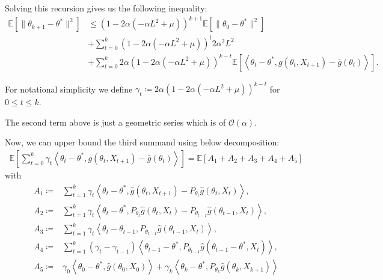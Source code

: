 \documentclass[a4paper]{article}
\newcommand{\norm}[1]{\|#1 \|}
\newcommand{\Exs}{\mathbb{E}}
\newcommand{\thetastar}{\theta^*}
\newcommand{\stepsize}{\alpha}
\begin{document}
	Solving this recursion gives us the following inequality:
	\begin{align*}
		\Exs\left[\norm{\theta_{k + 1} - \thetastar}^{2}\right] & \le \left(1 - 2\stepsize\left(-\stepsize L^{2} + \mu\right)\right)^{k + 1}\Exs\left[\norm{\theta_{0} - \thetastar}^{2}\right] \\
		& + \sum_{t = 0}^{k}\left(1 - 2\stepsize\left(-\stepsize L^{2} + \mu\right)\right)^{t}2\stepsize^{2}L^{2} \\
		& + \sum_{t = 0}^{k}2\stepsize\left(1 - 2\stepsize\left(-\stepsize L^{2} + \mu\right)\right)^{k - t}\Exs\left[\left\langle \theta_{t} - \thetastar, g\left(\theta_{t}, X_{t + 1}\right) - \bar{g}\left(\theta_{t}\right) \right\rangle\right].
	\end{align*}
	
	For notational simplicity we define $\gamma_{t} \coloneq 2\stepsize\left(1 - 2\stepsize\left(-\stepsize L^{2} + \mu\right)\right)^{k - t}$ for $0 \le t \le k$.
	
	The second term above is just a geometric series which is of $\mathcal{O}\left(\stepsize\right)$.
	
	Now, we can upper bound the third summand using below decomposition:
	\begin{align*}
		\Exs\left[ \sum_{t = 0}^{k} \gamma_{t}\left\langle \theta_{t} - \thetastar, g(\theta_{t}, X_{t + 1}) - \bar{g}(\theta_{t}) \right\rangle \right] = \Exs\left[ A_{1} + A_{2} + A_{3} + A_{4} + A_{5}\right]
	\end{align*}
	with
	\begin{align*}
		A_{1} \coloneq & \sum_{t = 1}^{k}\gamma_{t}\left\langle \theta_{t} - \thetastar, \hat{g}\left(\theta_{t}, X_{t + 1}\right) - P_{\theta_{t}}\hat{g}\left(\theta_{t}, X_{t}\right) \right\rangle,\\
		A_{2} \coloneq & \sum_{t = 1}^{k}\gamma_{t}\left\langle \theta_{t} - \thetastar, P_{\theta_{t}}\hat{g}\left(\theta_{t}, X_{t}\right) - P_{\theta_{t - 1}}\hat{g}\left( \theta_{t - 1}, X_{t} \right) \right\rangle,\\
		A_{3} \coloneq & \sum_{t = 1}^{k}\gamma_{t}\left\langle \theta_{t} - \theta_{t - 1}, P_{\theta_{t - 1}}\hat{g}\left( \theta_{t - 1}, X_{t}\right) \right\rangle,\\
		A_{4} \coloneq & \sum_{t = 1}^{k}\left(\gamma_{t} - \gamma_{t - 1}\right)\left\langle \theta_{t - 1} - \thetastar, P_{\theta_{t - 1}}\hat{g}\left( \theta_{t - 1} - \thetastar, X_{t}\right) \right\rangle,\\
		A_{5} \coloneq & \gamma_{0}\left\langle \theta_{0} - \thetastar, \hat{g}\left(\theta_{0}, X_{0}\right) \right\rangle + \gamma_{k}\left\langle \theta_{k} - \thetastar, P_{\theta_{k}}\hat{g}\left(\theta_{k}, X_{k + 1}\right)\right\rangle
	\end{align*}
	
\end{document}

